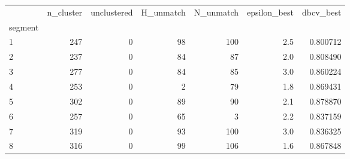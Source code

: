 \begin{tabular}{lrrrrrr}
\toprule
{} &  n\_cluster &  unclustered &  H\_unmatch &  N\_unmatch &  epsilon\_best &  dbcv\_best \\
segment &            &              &            &            &               &            \\
\midrule
1       &        247 &            0 &         98 &        100 &           2.5 &   0.800712 \\
2       &        237 &            0 &         84 &         87 &           2.0 &   0.808490 \\
3       &        277 &            0 &         84 &         85 &           3.0 &   0.860224 \\
4       &        253 &            0 &          2 &         79 &           1.8 &   0.869431 \\
5       &        302 &            0 &         89 &         90 &           2.1 &   0.878870 \\
6       &        257 &            0 &         65 &          3 &           2.2 &   0.837159 \\
7       &        319 &            0 &         93 &        100 &           3.0 &   0.836325 \\
8       &        316 &            0 &         99 &        106 &           1.6 &   0.867848 \\
\bottomrule
\end{tabular}
